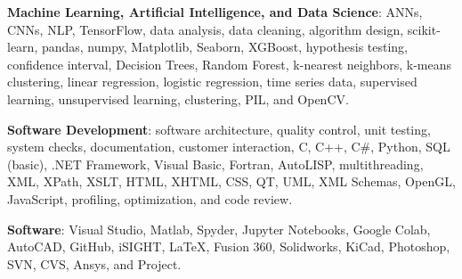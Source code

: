 \documentclass{leresume}
\begin{document}
    \begin{bulletedlist}
		
		\item \textbf{Machine Learning, Artificial Intelligence, and Data Science}: ANNs,
                        CNNs,
                        NLP,
                        TensorFlow,
                        data analysis,
                        data cleaning,
                        algorithm design,
                        scikit-learn,
                        pandas,
                        numpy,
                        Matplotlib,
                        Seaborn,
                        XGBoost,
                        hypothesis testing,
                        confidence interval,
                        Decision Trees,
                        Random Forest,
                        k-nearest neighbors,
                        k-means clustering,
                        linear regression,
                        logistic regression,
                        time series data,
                        supervised learning,
                        unsupervised learning,
                        clustering,
                        PIL,
                        and OpenCV.
                        
		\item \textbf{Software Development}: software architecture,
                        quality control,
                        unit testing,
                        system checks,
                        documentation,
                        customer interaction,
                        C,
                        C++,
                        C\#,
                        Python,
                        SQL (basic),
                        .NET Framework,
                        Visual Basic,
                        Fortran,
                        AutoLISP,
                        multithreading,
                        XML,
                        XPath,
                        XSLT,
                        HTML,
                        XHTML,
                        CSS,
                        QT,
                        UML,
                        XML Schemas,
                        OpenGL,
                        JavaScript,
                        profiling,
                        optimization,
                        and code review.
                        
		\item \textbf{Software}: Visual Studio,
                        Matlab,
                        Spyder,
                        Jupyter Notebooks,
                        Google Colab,
                        AutoCAD,
                        GitHub,
                        iSIGHT,
                        LaTeX,
                        Fusion 360,
                        Solidworks,
                        KiCad,
                        Photoshop,
                        SVN,
                        CVS,
                        Ansys,
                        and Project.
                        

\end{bulletedlist}
\end{document}
